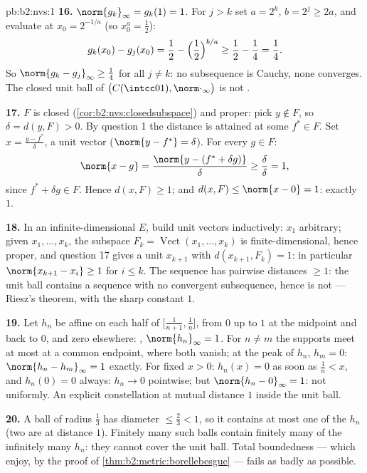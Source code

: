 \begin{solution}{pb:b2:nvs:1}
\textbf{16.} $\norm{g_k}_\infty = g_k(1) = 1$. For $j > k$ set
$a = 2^k$, $b = 2^j \geq 2a$, and evaluate at $x_0 = 2^{-1/a}$
(so $x_0^a = \frac12$):
\[
g_k(x_0) - g_j(x_0) = \frac12 - \Bigl(\frac12\Bigr)^{b/a}
\geq \frac12 - \frac14 = \frac14 .
\]
So $\norm{g_k - g_j}_\infty \geq \frac14$ for all $j \neq k$: no
subsequence is Cauchy, none converges. The closed unit ball of
$\bigl(C(\intcc01), \norm\cdot_\infty\bigr)$ is not .

\textbf{17.} $F$ is closed (\cref{cor:b2:nvs:closedsubspace})
and proper: pick $y \notin F$, so $\delta = d(y, F) > 0$. By
question 1 the distance is attained at some $f^* \in F$. Set $x
= \frac{y - f^*}{\delta}$, a unit vector ($\norm{y - f^*} =
\delta$). For every $g \in F$:
\[
\norm{x - g} = \frac{\norm{y - (f^* + \delta g)}}{\delta}
\geq \frac{\delta}{\delta} = 1 ,
\]
since $f^* + \delta g \in F$. Hence $d(x, F) \geq 1$; and $d(x,
F) \leq \norm{x - 0} = 1$: exactly $1$.

\textbf{18.} In an infinite-dimensional $E$, build unit vectors
inductively: $x_1$ arbitrary; given $x_1, \dots, x_k$, the
subspace $F_k = \operatorname{Vect}(x_1, \dots, x_k)$ is
finite-dimensional, hence proper, and question 17 gives a unit
$x_{k+1}$ with $d(x_{k+1}, F_k) = 1$: in particular
$\norm{x_{k+1} - x_i} \geq 1$ for $i \leq k$. The sequence has
pairwise distances $\geq 1$: the unit ball contains a sequence
with no convergent subsequence, hence is not  ---
Riesz's theorem, with the sharp constant $1$.

\textbf{19.} Let $h_n$ be affine on each half of
$\bigl[\frac1{n+1}, \frac1n\bigr]$, from $0$ up to $1$ at the
midpoint and back to $0$, and zero elsewhere: ,
$\norm{h_n}_\infty = 1$. For $n \neq m$ the supports meet at
most at a common endpoint, where both vanish; at the peak of
$h_n$, $h_m = 0$: $\norm{h_n - h_m}_\infty = 1$ exactly. For
fixed $x > 0$: $h_n(x) = 0$ as soon as $\frac1n < x$, and
$h_n(0) = 0$ always: $h_n \to 0$ pointwise; but
$\norm{h_n - 0}_\infty = 1$: not uniformly. An explicit
constellation at mutual distance $1$ inside the unit ball.

\textbf{20.} A ball of radius $\frac13$ has diameter $\leq
\frac23 < 1$, so it contains at most one of the $h_n$ (two are
at distance $1$). Finitely many such balls contain finitely many
of the infinitely many $h_n$: they cannot cover the unit ball.
Total boundedness --- which  enjoy, by the
proof of \cref{thm:b2:metric:borellebesgue} --- fails as badly
as possible.


\end{solution}
